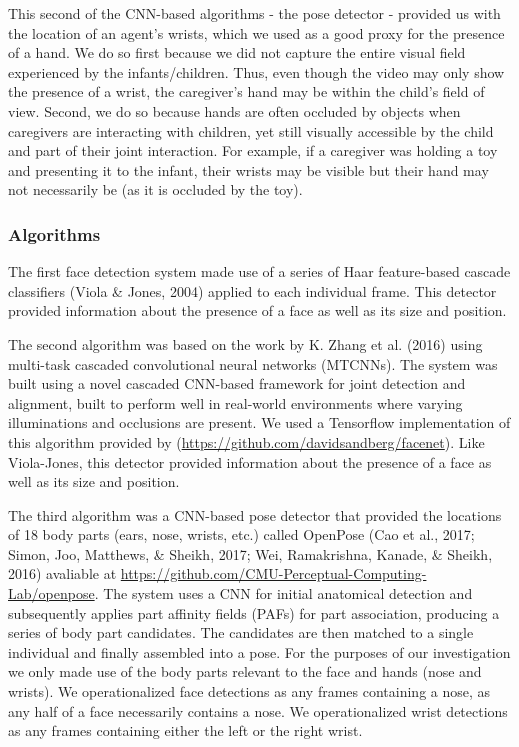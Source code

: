 \documentclass[10pt, letterpaper]{article}
\begin{document}
This second of the CNN-based algorithms - the pose detector - provided
us with the location of an agent's wrists, which we used as a good proxy
for the presence of a hand. We do so first because we did not capture
the entire visual field experienced by the infants/children. Thus, even
though the video may only show the presence of a wrist, the caregiver's
hand may be within the child's field of view. Second, we do so because
hands are often occluded by objects when caregivers are interacting with
children, yet still visually accessible by the child and part of their
joint interaction. For example, if a caregiver was holding a toy and
presenting it to the infant, their wrists may be visible but their hand
may not necessarily be (as it is occluded by the toy).

\subsubsection{Algorithms}\label{algorithms}

The first face detection system made use of a series of Haar
feature-based cascade classifiers (Viola \& Jones, 2004) applied to each
individual frame. This detector provided information about the presence
of a face as well as its size and position.

The second algorithm was based on the work by K. Zhang et al. (2016)
using multi-task cascaded convolutional neural networks (MTCNNs). The
system was built using a novel cascaded CNN-based framework for joint
detection and alignment, built to perform well in real-world
environments where varying illuminations and occlusions are present. We
used a Tensorflow implementation of this algorithm provided by
(\url{https://github.com/davidsandberg/facenet}). Like Viola-Jones, this
detector provided information about the presence of a face as well as
its size and position.

The third algorithm was a CNN-based pose detector that provided the
locations of 18 body parts (ears, nose, wrists, etc.) called OpenPose
(Cao et al., 2017; Simon, Joo, Matthews, \& Sheikh, 2017; Wei,
Ramakrishna, Kanade, \& Sheikh, 2016) avaliable at
\url{https://github.com/CMU-Perceptual-Computing-Lab/openpose}. The
system uses a CNN for initial anatomical detection and subsequently
applies part affinity fields (PAFs) for part association, producing a
series of body part candidates. The candidates are then matched to a
single individual and finally assembled into a pose. For the purposes of
our investigation we only made use of the body parts relevant to the
face and hands (nose and wrists). We operationalized face detections as
any frames containing a nose, as any half of a face necessarily contains
a nose. We operationalized wrist detections as any frames containing
either the left or the right wrist.
\end{document}
